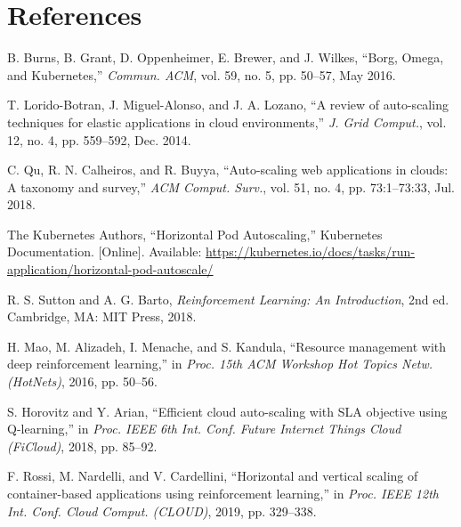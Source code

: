 \chapter{References}
\label{ch:references}

\begingroup
\singlespacing
\begin{enumerate}[label={[\arabic*]}, leftmargin=2.4em, itemsep=0.4em]

\item\label{burns2016borg} B. Burns, B. Grant, D. Oppenheimer, E. Brewer, and J. Wilkes, ``Borg, Omega, and Kubernetes,'' \textit{Commun. ACM}, vol. 59, no. 5, pp. 50--57, May 2016.

\item\label{lorido2014review} T. Lorido-Botran, J. Miguel-Alonso, and J. A. Lozano, ``A review of auto-scaling techniques for elastic applications in cloud environments,'' \textit{J. Grid Comput.}, vol. 12, no. 4, pp. 559--592, Dec. 2014.

\item\label{qu2018survey} C. Qu, R. N. Calheiros, and R. Buyya, ``Auto-scaling web applications in clouds: A taxonomy and survey,'' \textit{ACM Comput. Surv.}, vol. 51, no. 4, pp. 73:1--73:33, Jul. 2018.

\item\label{k8s_hpa_docs} The Kubernetes Authors, ``Horizontal Pod Autoscaling,'' Kubernetes Documentation. [Online]. Available: \url{https://kubernetes.io/docs/tasks/run-application/horizontal-pod-autoscale/}

\item\label{sutton2018rl} R. S. Sutton and A. G. Barto, \textit{Reinforcement Learning: An Introduction}, 2nd ed. Cambridge, MA: MIT Press, 2018.

\item\label{mao2016resource} H. Mao, M. Alizadeh, I. Menache, and S. Kandula, ``Resource management with deep reinforcement learning,'' in \textit{Proc. 15th ACM Workshop Hot Topics Netw. (HotNets)}, 2016, pp. 50--56.

\item\label{horovitz2018qlearning} S. Horovitz and Y. Arian, ``Efficient cloud auto-scaling with SLA objective using Q-learning,'' in \textit{Proc. IEEE 6th Int. Conf. Future Internet Things Cloud (FiCloud)}, 2018, pp. 85--92.

\item\label{rossi2019horizontal} F. Rossi, M. Nardelli, and V. Cardellini, ``Horizontal and vertical scaling of container-based applications using reinforcement learning,'' in \textit{Proc. IEEE 12th Int. Conf. Cloud Comput. (CLOUD)}, 2019, pp. 329--338.


\end{enumerate}
